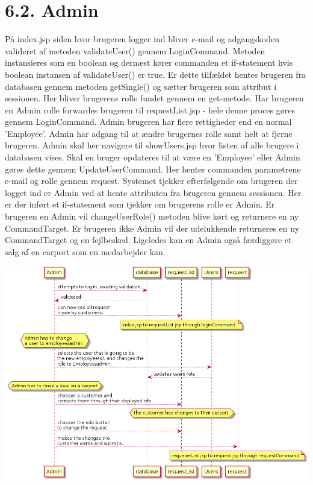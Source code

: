\documentclass[11pt]{report}
\begin{document}
\section*{6.2. Admin}
På index.jsp siden hvor brugeren logger ind bliver e-mail og adgangskoden valideret af metoden validateUser() gennem LoginCommand. Metoden instansieres som en boolean og dernæst kører commanden et if-statement hvis boolean instansen af validateUser() er true. Er dette tilfældet hentes brugeren fra databasen gennem metoden getSingle() og sætter brugeren som attribut i sessionen. Her bliver brugerens rolle fundet gennem en get-metode. Har brugeren en Admin rolle forwardes brugeren til requestList.jsp - hele denne proces gøres gennem LoginCommand.
Admin brugeren har flere rettigheder end en normal ’Employee’. Admin har adgang til at ændre brugernes rolle samt helt at fjerne brugeren. Admin skal her navigere til showUsers.jsp hvor listen af alle brugere i databasen vises. Skal en bruger opdateres til at være en ’Employee’ eller Admin gøres dette gennem UpdateUserCommand. Her henter commanden parametrene e-mail og rolle gennem request. Systemet tjekker efterfølgende om brugeren der logget ind er Admin ved at hente attributen fra brugeren gennem sessionen. Her er der inført et if-statement som tjekker om brugerens rolle er Admin. Er brugeren en Admin vil changeUserRole() metoden blive kørt og returnere en ny CommandTarget. Er brugeren ikke Admin vil der udelukkende returneres en ny CommandTarget og en fejlbesked.
Ligeledes kan en Admin også færdiggøre et salg af en carport som en medarbejder kan. 
\begin{center}
\includegraphics[width=15cm]{AdminArbejde.png}
\end{center}
\newpage
\end{document}
